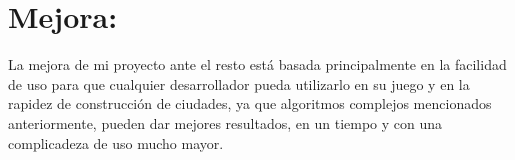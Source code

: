 \section{Mejora:}

La mejora de mi proyecto ante el resto está basada principalmente en la facilidad de uso para que cualquier desarrollador pueda utilizarlo en su juego y en la rapidez de construcción de ciudades, ya que algoritmos complejos mencionados anteriormente, pueden dar mejores resultados, en un tiempo y con una complicadeza de uso mucho mayor.

\newpage